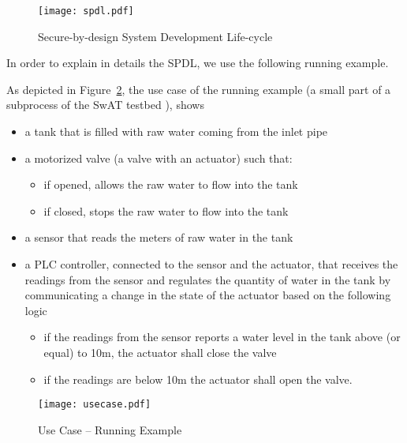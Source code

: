\begin{figure}[t]
	\centering
	\texttt{[image: spdl.pdf]}
	\caption{Secure-by-design System Development Life-cycle}
	\label{fig:spdl}
\end{figure}

In order to explain in details the SPDL, we use the following running example.
\begin{example}
	As depicted in Figure~\ref{fig:usecase}, the use case of the running example
	(a small part of a subprocess of the SwAT testbed \autocite{Mathur2016swat}), shows
	\begin{itemize}[noitemsep]
		\item a tank that is filled with raw water coming from the inlet pipe 
		\item a motorized valve (a valve with an actuator) such that:
			\begin{itemize}
				\item if opened, allows the raw water to flow into the tank
				\item if closed, stops the raw water to flow into the tank
			\end{itemize}
		\item a sensor that reads the meters of raw water in the tank
		\item a PLC controller, connected to the sensor and the
			actuator, that receives the readings from the sensor
			and regulates the quantity of water in the tank by
			communicating a change in the state of the actuator
			based on the following logic
			\begin{itemize}
				\item if the readings from the sensor reports a
					water level in the tank above (or
					equal) to 10m, the actuator shall close
					the valve
				\item if the readings are below 10m the actuator
					shall open the valve.
			\end{itemize}
	\end{itemize}

\begin{figure}[t]
	\centering
	\texttt{[image: usecase.pdf]}
	\caption{Use Case -- Running Example}
	\label{fig:usecase}
\end{figure}
\end{example}


